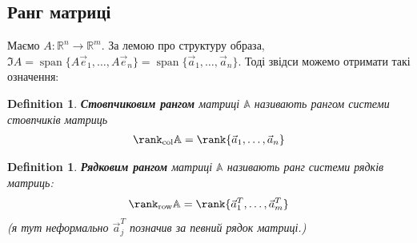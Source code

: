 \documentclass[a4paper, 10pt]{article}
\theoremstyle{theoremdd}
\newtheorem{definition}[theorem]{Definition}
\DeclareMathOperator{\linspan}{span}
\begin{document}
\iffalse
Час повернутись до формули $\det (\mathbb{A} \mathbb{B}) = \det \mathbb{A} \det \mathbb{B}$.\\
Розглянемо випадок, коли $\det \mathbb{B} = 0$\\
Тоді звідси $\{\vec{b}_1, \dots, \vec{b}_n\}$ - л.з., зокрема $\{\mathbb{A}\vec{b}_1, \dots, \mathbb{A} \vec{b}_n\}$ - л.з. $\implies \det \mathbb{A} \mathbb{B} = 0$\\
Тепер ця властивість є коректною.
\bigskip \\
Повернімось теперь до $\det \begin{pmatrix}
 \mathbb{A} & \vline & \mathbb{C} \\
 \hline
 \mathbb{O} & \vline & \mathbb{B}
\end{pmatrix} = \det \mathbb{A} \det \mathbb{B}$.\\
Знову нехай $\det \mathbb{B} = 0 \implies \det \mathbb{A} \mathbb{B} = 0$\\
Тоді звідси $\{ \vec{b}_1,\dots,\vec{b}_n \}$ - л.з. А оскільки $\det \mathbb{B} = \det \mathbb{B}^T$, то звідси $\{ \overleftarrow{b}_1,\dots,\overleftarrow{b}_n \}$ - система рядків матриці $\mathbb{B}$ - л.з.\\
А тому рядки блочно трикутної матриці - л.з. $\Rightarrow \det \begin{pmatrix}
 \mathbb{A} & \vline & \mathbb{C} \\
 \hline
 \mathbb{O} & \vline & \mathbb{B}
\end{pmatrix} = 0$.
\fi

\subsection{Ранг матриці}
Маємо $A \colon \mathbb{R}^n \to \mathbb{R}^m$. За лемою про структуру образа, $\Im A = \linspan\{A\vec{e}_1,\dots, A\vec{e}_n\} = \linspan\{\vec{a}_1,\dots,\vec{a}_n\}$. Тоді звідси можемо отримати такі означення:
\begin{definition}
\textbf{Стовпчиковим рангом} матриці $\mathbb{A}$ називають рангом системи стовпчиків матриць
\begin{align*}
\rank_{\textrm{col}} \mathbb{A} = \rank \{\vec{a}_1,\dots,\vec{a}_n\}
\end{align*}
\end{definition}

\begin{definition}
\textbf{Рядковим рангом} матриці $\mathbb{A}$ називають ранг системи рядків матриць:
\begin{align*}
\rank_{\textrm{row}} \mathbb{A} = \rank \{\vec{a}^T_1,\dots, \vec{a}^T_m \}
\end{align*}
(я тут неформально $\vec{a}^T_j$ позначив за певний рядок матриці.)
\end{definition}
\end{document}
